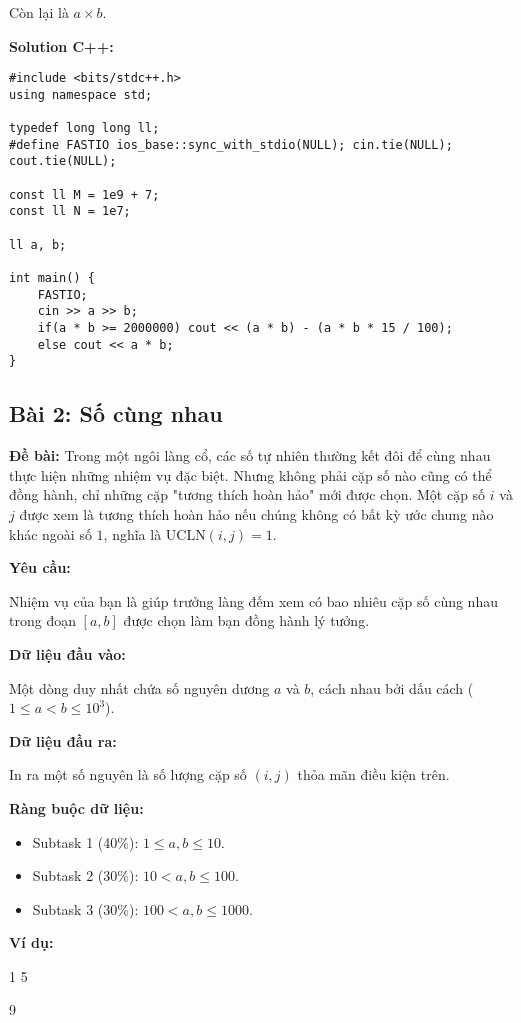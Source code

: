 \documentclass[12pt]{scrartcl}  %
\begin{document}
Còn lại là $a \times b$.

\textbf{Solution C++:}
\begin{lstlisting}
#include <bits/stdc++.h>
using namespace std;

typedef long long ll;
#define FASTIO ios_base::sync_with_stdio(NULL); cin.tie(NULL); cout.tie(NULL);

const ll M = 1e9 + 7;
const ll N = 1e7;

ll a, b;

int main() {
    FASTIO;
    cin >> a >> b;
    if(a * b >= 2000000) cout << (a * b) - (a * b * 15 / 100);
    else cout << a * b;
}
\end{lstlisting}

\subsection{Bài 2: Số cùng nhau}
\textbf{Đề bài:}
Trong một ngôi làng cổ, các số tự nhiên thường kết đôi để cùng nhau thực hiện những nhiệm vụ đặc biệt. Nhưng không phải cặp số nào cũng có thể đồng hành, chỉ những cặp "tương thích hoàn hảo" mới được chọn. Một cặp số $i$ và $j$ được xem là tương thích hoàn hảo nếu chúng không có bất kỳ ước chung nào khác ngoài số $1$, nghĩa là $\mathrm{UCLN}(i, j) = 1$.

\textbf{Yêu cầu:}

Nhiệm vụ của bạn là giúp trưởng làng đếm xem có bao nhiêu cặp số cùng nhau trong đoạn $[a, b]$ được chọn làm bạn đồng hành lý tưởng.

\textbf{Dữ liệu đầu vào:}

Một dòng duy nhất chứa số nguyên dương $a$ và $b$, cách nhau bởi dấu cách ($1 \leq a < b \leq 10^3$).

\textbf{Dữ liệu đầu ra:}

In ra một số nguyên là số lượng cặp số $(i, j)$ thỏa mãn điều kiện trên.

\textbf{Ràng buộc dữ liệu:}

\begin{itemize}
    \item Subtask 1 (40\%): $1 \leq a, b \leq 10$.
    \item Subtask 2 (30\%): $10 < a, b \leq 100$.
    \item Subtask 3 (30\%): $100 < a, b \leq 1000$.
\end{itemize}

\textbf{Ví dụ:}
\begin{tcolorbox}[colback=gray!5!white, colframe=blue!50!black, title=Input]
1 5
\end{tcolorbox}
\begin{tcolorbox}[colback=gray!5!white, colframe=green!50!black, title=Output]
9
\end{tcolorbox}
\end{document}
